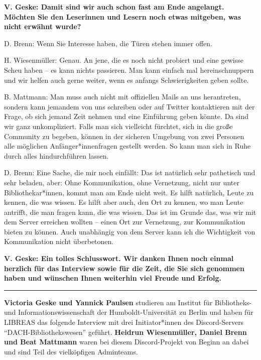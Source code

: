 \documentclass[a4paper,
fontsize=11pt,
oneside,
numbers=noperiodatend,
parskip=half-,
bibliography=totoc,
final
]{scrartcl}
\begin{document}
\textbf{V. Geske: Damit sind wir auch schon fast am Ende angelangt.
Möchten Sie den Leserinnen und Lesern noch etwas mitgeben, was nicht
erwähnt wurde?}

D. Brenn: Wenn Sie Interesse haben, die Türen stehen immer offen.

H. Wiesenmüller: Genau. An jene, die es noch nicht probiert und eine
gewisse Scheu haben -- es kann nichts passieren. Man kann einfach mal
hereinschnuppern und wir helfen auch gerne weiter, wenn es anfangs
Schwierigkeiten geben sollte.

B. Mattmann: Man muss auch nicht mit offiziellen Mails an uns
herantreten, sondern kann jemandem von uns schreiben oder auf Twitter
kontaktieren mit der Frage, ob sich jemand Zeit nehmen und eine
Einführung geben könnte. Da sind wir ganz unkompliziert. Falls man sich
vielleicht fürchtet, sich in die große Community zu begeben, können in
der sicheren Umgebung von zwei Personen alle möglichen Anfänger*innenfragen
gestellt werden. So kann man sich in Ruhe durch alles hindurchführen
lassen.

D. Brenn: Eine Sache, die mir noch einfällt: Das ist natürlich sehr
pathetisch und sehr beladen, aber: Ohne Kommunikation, ohne Vernetzung,
nicht nur unter Bibliothekar*innen, kommt man am Ende nicht weit. Es
hilft natürlich, Leute zu kennen, die was wissen. Es hilft aber auch,
den Ort zu kennen, wo man Leute antrifft, die man fragen kann, die was
wissen. Das ist im Grunde das, was wir mit dem Server erreichen wollten
-- einen Ort zur Vernetzung, zur Kommunikation bieten zu können. Auch
unabhängig von dem Server kann ich die Wichtigkeit von Kommunikation
nicht überbetonen.

\textbf{V. Geske: Ein tolles Schlusswort. Wir danken Ihnen noch einmal
herzlich für das Interview sowie für die Zeit, die Sie sich genommen
haben und wünschen Ihnen weiterhin viel Freude und Erfolg.}

\begin{center}\rule{0.5\linewidth}{0.5pt}\end{center}

\textbf{Victoria Geske und Yannick Paulsen}  studieren am
Institut für Bibliotheks- und Informationswissenschaft der
Humboldt-Universität zu Berlin und haben für LIBREAS das folgende
Interview mit drei Initiator*innen des Discord-Servers
\enquote{DACH-Bibliothekswesen} geführt. \textbf{Heidrun Wiesenmüller, Daniel Brenn
und Beat Mattmann} waren bei diesem Discord-Projekt von Beginn an dabei
und sind Teil des vielköpfigen Adminteams.
\end{document}

